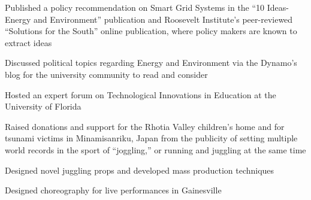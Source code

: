 \documentclass[letterpaper]{article}
\begin{document}
\begin{compactitem}
	\item Published a policy recommendation on Smart Grid Systems in the “10 Ideas- Energy and Environment” publication and Roosevelt Institute’s peer-reviewed “Solutions for the South” online publication, where policy makers are known to extract ideas\\
	\item Discussed political topics regarding Energy and Environment via the Dynamo’s blog for the university community to read and consider\\
	\item Hosted an expert forum on Technological Innovations in Education at the University of Florida
\end{compactitem}



\noindent{\Large\textbf {\\LEADERSHIP}}

\begin{compactitem}
	\item Raised donations and support for the Rhotia Valley children’s home and for tsunami victims in Minamisanriku, Japan from the publicity of setting multiple world records in the sport of “joggling,” or running and juggling at the same time
\end{compactitem}

\begin{compactitem}
	\item Designed novel juggling props and developed mass production techniques\\
	\item Designed choreography for live performances in Gainesville
\end{compactitem}
\end{document}
